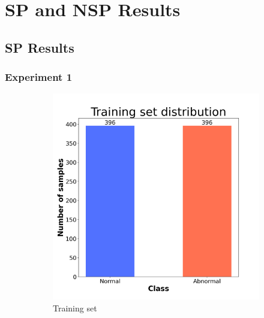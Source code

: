 \chapter{SP and NSP Results}
\section*{\hypertarget{appspnsp}{SP Results}}

\subsection*{Experiment 1}


\begin{figure}[H]
    \centering
\begin{subfigure}[t]{0.45\textwidth}
    \centering
    \includegraphics[width=1\textwidth]{images/exper1/SP/train_dist.png}
    \caption{Training set}
\end{subfigure}
\begin{subfigure}[t]{0.45\textwidth}
    \centering

\end{subfigure}
\end{figure}
